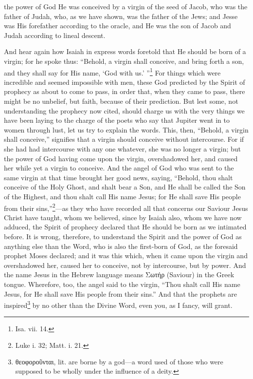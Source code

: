 the power of God He was conceived by a virgin of the seed of Jacob, who was the father of Judah, who, as we have shown, was the father of the Jews; and Jesse was His forefather according to the oracle, and He was the son of Jacob and Judah according to lineal descent.


And hear again how Isaiah in express words foretold that He should be born of a virgin; for he spoke thus: “Behold, a virgin shall conceive, and bring forth a son, and they shall say for His name, ‘God with us.’ ”\footnote{Isa. vii. 14.} For things which were incredible and seemed impossible with men, these God predicted by the Spirit of prophecy as about to come to pass, in order that, when they came to pass, there might be no unbelief, but faith, because of their prediction. But lest some, not understanding the prophecy now cited, should charge us with the very things we have been laying to the charge of the poets who say that Jupiter went in to women through lust, let us try to explain the words. This, then, “Behold, a virgin shall conceive,” signifies that a virgin should conceive without intercourse. For if she had had intercourse with any one whatever, she was no longer a virgin; but the power of God having come upon the virgin, overshadowed her, and caused her while yet a virgin to conceive. And the angel of God who was sent to the same virgin at that time brought her good news, saying, “Behold, thou shalt conceive of the Holy Ghost, and shalt bear a Son, and He shall be called the Son of the Highest, and thou shalt call His name Jesus; for He shall save His people from their sins,”\footnote{Luke i. 32; Matt. i. 21.}—as they who have recorded all that concerns our Saviour Jesus Christ have taught, whom we believed, since by Isaiah also, whom we have now adduced, the Spirit of prophecy declared that He should be born as we intimated before. It is wrong, therefore, to understand the Spirit and the power of God as anything else than the Word, who is also the first-born of God, as the foresaid prophet Moses declared; and it was this which, when it came upon the virgin and overshadowed her, caused her to conceive, not by intercourse, but by power. And the name Jesus in the Hebrew language means \textgreek{Σωτήρ} (Saviour) in the Greek tongue. Wherefore, too, the angel said to the virgin, “Thou shalt call His name Jesus, for He shall save His people from their sins.” And that the prophets are inspired\footnote{\textgreek{θεοφοροῦνται}, lit. are borne by a god—a word used of those who were supposed to be wholly under the influence of a deity.} by no other than the Divine Word, even you, as I fancy, will grant.

